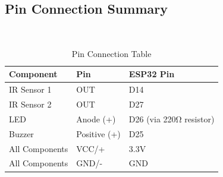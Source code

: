 \documentclass[12pt,a4paper]{article}
\begin{document}
\subsection{Pin Connection Summary}
\\
\begin{table}[h!]
\centering
\begin{tabular}{|l|l|l|}
\hline
\textbf{Component} & \textbf{Pin} & \textbf{ESP32 Pin} \\
\hline
IR Sensor 1 & OUT & D14 \\
IR Sensor 2 & OUT & D27 \\
LED & Anode (+) & D26 (via 220Ω resistor) \\
Buzzer & Positive (+) & D25 \\
All Components & VCC/+ & 3.3V \\
All Components & GND/- & GND \\
\hline
\end{tabular}
\caption{Pin Connection Table}
\end{table}
\end{document}
